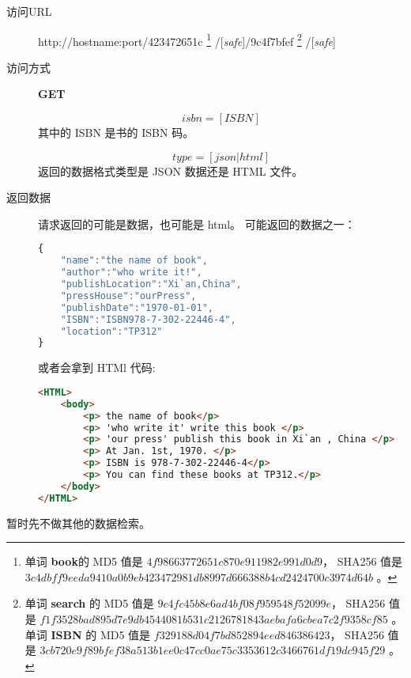 \documentclass[UTF8]{article}
\def\safe{/[\textit{safe}]}
\def\GET{\colorbox[rgb]{0.77,0.53,0.97}{\textbf{GET}}}
\def\viaurl{\item[{\quad\colorbox[rgb]{0.47,0.88,0.89}{访问URL}}]}
\def\viareq#1{\item[{\quad\colorbox[rgb]{0.57,0.88,0.99}{访问方式}}] #1}
\def\rtdata{\item[{\quad\colorbox[rgb]{0.70,0.9,0.59}{返回数据}}]}
\begin{document}
                \begin{description}

                    \viaurl http://hostname:port/423472651c
                    \footnote{单词 \textbf{book}的
                        MD5 值是 $4f98663772651c870e911982e991d0d9$，
                        SHA256 值是
                        $3c4dbff9eeda9410a0b9eb423472981db8997d666388b4cd2424700c3974d64b$
                        。
                    }
                    \safe/9c4f7bfef
                    \footnote{
                        单词 \textbf{search} 的
                        MD5 值是 $9c4fc45b8e6ad4bf08f959548f52099e$，
                        SHA256 值是
                        $f1f3528bad895d7e9db4544081b531c2126781843aebafa6cbea7c2f9358cf85$
                        。
                        单词 \textbf{ISBN} 的
                        MD5 值是 $f329188d04f7bd852894eed846386423$，
                        SHA256 值是
                        $3cb720e9f89bfef38a513b1ee0c47cc0ae75c3353612c3466761df19dc945f29$
                        。
                    }
                    \safe


                    \viareq \GET


                    $$isbn=[ISBN]$$
                    其中的 ISBN 是书的 ISBN 码。


                    $$type=[json|html]$$
                    返回的数据格式类型是 JSON 数据还是 HTML 文件。

                    \rtdata 请求返回的可能是数据，也可能是 html。
                    可能返回的数据之一：
                    \begin{lstlisting}[language=JavaScript]
{
    "name":"the name of book",
    "author":"who write it!",
    "publishLocation":"Xi`an,China",
    "pressHouse":"ourPress",
    "publishDate":"1970-01-01",
    "ISBN":"ISBN978-7-302-22446-4",
    "location":"TP312"
}
                    \end{lstlisting}
                    或者会拿到 HTMl 代码:
                    \begin{lstlisting}[language=HTML]
<HTML>
    <body>
        <p> the name of book</p>
        <p> 'who write it' write this book </p>
        <p> 'our press' publish this book in Xi`an , China </p>
        <p> At Jan. 1st, 1970. </p>
        <p> ISBN is 978-7-302-22446-4</p>
        <p> You can find these books at TP312.</p>
    </body>
</HTML>
                    \end{lstlisting}
                \end{description}
        暂时先不做其他的数据检索。
\end{document}
